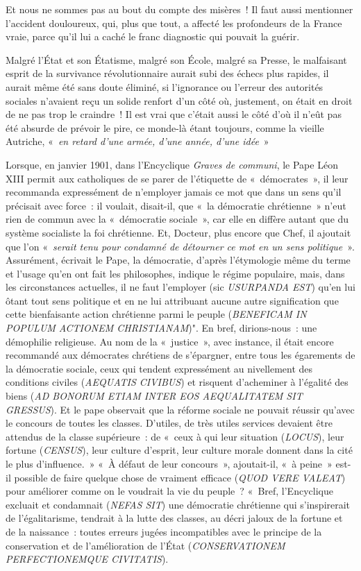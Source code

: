 \documentclass[french,twoside]{book} %
\begin{document}
Et nous ne sommes pas au bout du compte des misères ! Il faut aussi mentionner l’accident douloureux, qui, plus que tout, a affecté les profondeurs de la France vraie, parce qu’il lui a caché le franc diagnostic qui pouvait la guérir.\par
Malgré l’État et son Étatisme, malgré son École, malgré sa Presse, le malfaisant esprit de la survivance révolutionnaire aurait subi des échecs plus rapides, il aurait même été sans doute éliminé, si l’ignorance ou l’erreur des autorités sociales n’avaient reçu un solide renfort d’un côté où, justement, on était en droit de ne pas trop le craindre ! Il est vrai que c’était aussi le côté d’où il n’eût pas été absurde de prévoir le pire, ce monde-là étant toujours, comme la vieille Autriche, « \emph{en retard d’une armée, d’une année, d’une idée} »\par
Lorsque, en janvier 1901, dans l’Encyclique \emph{Graves de communi}, le Pape Léon XIII permit aux catholiques de se parer de l’étiquette de « démocrates », il leur recommanda expressément de n’employer jamais ce mot que dans un sens qu’il précisait avec force : il voulait, disait-il, que « la démocratie chrétienne » n’eut rien de commun avec la « démocratie sociale », car elle en diffère autant que du système socialiste la foi chrétienne. Et, Docteur, plus encore que Chef, il ajoutait que l’on « \emph{serait tenu pour condamné de détourner ce mot en un sens politique} ». Assurément, écrivait le Pape, la démocratie, d’après l’étymologie même du terme et l’usage qu’en ont fait les philosophes, indique le régime populaire, mais, dans les circonstances actuelles, il ne faut l’employer (sic \emph{USURPANDA EST}) qu’en lui ôtant tout sens politique et en ne lui attribuant aucune autre signification que cette bienfaisante action chrétienne parmi le peuple (\emph{BENEFICAM IN POPULUM ACTIONEM CHRISTIANAM})". En bref, dirions-nous : une démophilie religieuse. Au nom de la « justice », avec instance, il était encore recommandé aux démocrates chrétiens de s’épargner, entre tous les égarements de la démocratie sociale, ceux qui tendent expressément au nivellement des conditions civiles (\emph{AEQUATIS CIVIBUS}) et risquent d’acheminer à l’égalité des biens (\emph{AD BONORUM ETIAM INTER EOS AEQUALITATEM SIT GRESSUS}). Et le pape observait que la réforme sociale ne pouvait réussir qu’avec le concours de toutes les classes. D’utiles, de très utiles services devaient être attendus de la classe supérieure : de « ceux à qui leur situation (\emph{LOCUS}), leur fortune (\emph{CENSUS}), leur culture d’esprit, leur culture morale donnent dans la cité le plus d’influence. » « À défaut de leur concours », ajoutait-il, « à peine » est-il possible de faire quelque chose de vraiment efficace (\emph{QUOD VERE VALEAT}) pour améliorer comme on le voudrait la vie du peuple ? « Bref, l’Encyclique excluait et condamnait (\emph{NEFAS SIT}) une démocratie chrétienne qui s’inspirerait de l’égalitarisme, tendrait à la lutte des classes, au décri jaloux de la fortune et de la naissance : toutes erreurs jugées incompatibles avec le principe de la conservation et de l’amélioration de l’État (\emph{CONSERVATIONEM PERFECTIONEMQUE CIVITATIS}).\par
\end{document}
